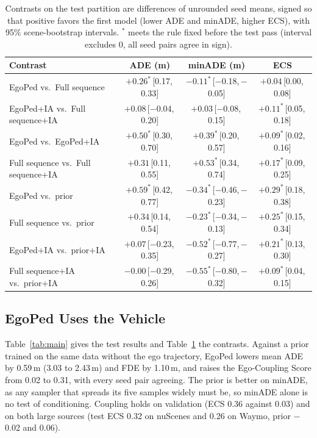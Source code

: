 \documentclass[letterpaper, 10 pt, conference]{ieeeconf}
\newcommand{\method}{EgoPed\xspace}
\newcommand{\fullseq}{Full sequence\xspace}
\newcommand{\ci}[2]{\,{\scriptsize[#1,\,#2]}}
\begin{document}
\begin{table}[t]
  \centering
  \caption{Contrasts on the test partition are differences of unrounded seed means, signed so that positive favors the first model (lower ADE and minADE, higher ECS), with 95\% scene-bootstrap intervals. $^\ast$ meets the rule fixed before the test pass (interval excludes 0, all seed pairs agree in sign).}
  \label{tab:contrasts}
  \vspace{4pt}
  \small
  \setlength{\tabcolsep}{8pt}
  \begin{tabular}{lccc}
    \toprule
    Contrast & ADE (m) & minADE (m) & ECS \\
    \midrule
    \method vs.\ \fullseq & $+0.26^\ast$\ci{0.17}{0.33} & $-0.11^\ast$\ci{$-$0.18}{$-$0.05} & $+0.04$\ci{0.00}{0.08} \\
    \method+IA vs.\ \fullseq+IA & $+0.08$\ci{$-$0.04}{0.20} & $+0.03$\ci{$-$0.08}{0.15} & $+0.11^\ast$\ci{0.05}{0.18} \\
    \method vs.\ \method+IA & $+0.50^\ast$\ci{0.30}{0.70} & $+0.39^\ast$\ci{0.20}{0.57} & $+0.09^\ast$\ci{0.02}{0.16} \\
    \fullseq vs.\ \fullseq+IA & $+0.31$\ci{0.11}{0.55} & $+0.53^\ast$\ci{0.34}{0.74} & $+0.17^\ast$\ci{0.09}{0.25} \\
    \method vs.\ prior & $+0.59^\ast$\ci{0.42}{0.77} & $-0.34^\ast$\ci{$-$0.46}{$-$0.23} & $+0.29^\ast$\ci{0.18}{0.38} \\
    \fullseq vs.\ prior & $+0.34$\ci{0.14}{0.54} & $-0.23^\ast$\ci{$-$0.34}{$-$0.13} & $+0.25^\ast$\ci{0.15}{0.34} \\
    \method+IA vs.\ prior+IA & $+0.07$\ci{$-$0.23}{0.35} & $-0.52^\ast$\ci{$-$0.77}{$-$0.27} & $+0.21^\ast$\ci{0.13}{0.30} \\
    \fullseq+IA vs.\ prior+IA & $-0.00$\ci{$-$0.29}{0.26} & $-0.55^\ast$\ci{$-$0.80}{$-$0.32} & $+0.09^\ast$\ci{0.04}{0.15} \\
    \bottomrule
  \end{tabular}
\end{table}

\subsection{\method Uses the Vehicle}
\label{sec:main}

Table~\ref{tab:main} gives the test results and Table~\ref{tab:contrasts} the contrasts.
Against a prior trained on the same data without the ego trajectory, \method lowers mean ADE by 0.59\,m (3.03 to 2.43\,m) and FDE by 1.10\,m, and raises the Ego-Coupling Score from 0.02 to 0.31, with every seed pair agreeing.
The prior is better on minADE, as any sampler that spreads its five samples widely must be, so minADE alone is no test of conditioning.
Coupling holds on validation (ECS 0.36 against 0.03) and on both large sources (test ECS 0.32 on nuScenes and 0.26 on Waymo, prior $-$0.02 and 0.06).
\end{document}
